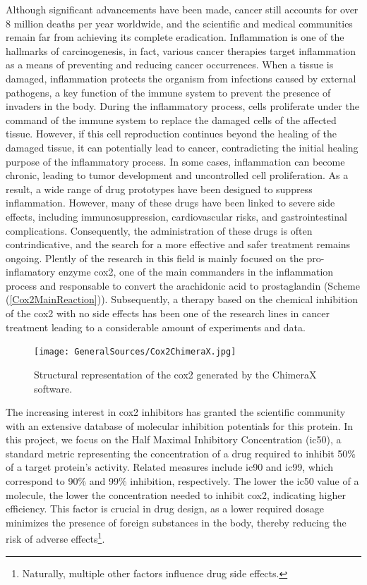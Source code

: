 \documentclass[11pt]{article}
\begin{document}
Although significant advancements have been made, cancer still accounts for over 8 million deaths per year worldwide, and the scientific and medical communities remain far from achieving its complete eradication. Inflammation is one of the hallmarks of carcinogenesis, in fact, various cancer therapies target inflammation as a means of preventing and reducing cancer occurrences. When a tissue is damaged, inflammation protects the organism from infections caused by external pathogens, a key function of the immune system to prevent the presence of invaders in the body. During the inflammatory process, cells proliferate under the command of the immune system to replace the damaged cells of the affected tissue. However, if this cell reproduction continues beyond the healing of the damaged tissue, it can potentially lead to cancer, contradicting the initial healing purpose of the inflammatory process. In some cases, inflammation can become chronic, leading to tumor development and uncontrolled cell proliferation. As a result, a wide range of drug prototypes have been designed to suppress inflammation. However, many of these drugs have been linked to severe side effects, including immunosuppression, cardiovascular risks, and gastrointestinal complications. Consequently, the administration of these drugs is often contrindicative, and the search for a more effective and safer treatment remains ongoing. Plently of the research in this field is mainly focused on the pro-inflamatory enzyme \gls{cox2}, one of the main commanders in the inflammation process and responsable to convert the arachidonic acid to prostaglandin  (Scheme (\ref{Cox2MainReaction})). Subsequently, a therapy based on the chemical inhibition of the \gls{cox2} with no side effects has been one of the research lines in cancer treatment leading to a considerable amount of experiments and data.
\begin{figure}[t]
	\centering
	\texttt{[image: GeneralSources/Cox2ChimeraX.jpg]}
	\caption{Structural representation of the \gls{cox2} generated by the ChimeraX software\cite{ChimeraX}.}
	\label{FigureCox2ChimeraX}
\end{figure}

The increasing interest in \gls{cox2} inhibitors has granted the scientific community with an extensive database of molecular inhibition potentials for this protein. In this project, we focus on the Half Maximal Inhibitory Concentration (\gls{ic50}), a standard metric representing the concentration of a drug required to inhibit 50\% of a target protein’s activity. Related measures include \gls{ic90} and \gls{ic99}, which correspond to 90\% and 99\% inhibition, respectively. The lower the \gls{ic50} value of a molecule, the lower the concentration needed to inhibit \gls{cox2}, indicating higher efficiency. This factor is crucial in drug design, as a lower required dosage minimizes the presence of foreign substances in the body, thereby reducing the risk of adverse effects\footnote{Naturally, multiple other factors influence drug side effects.}.
\end{document}
